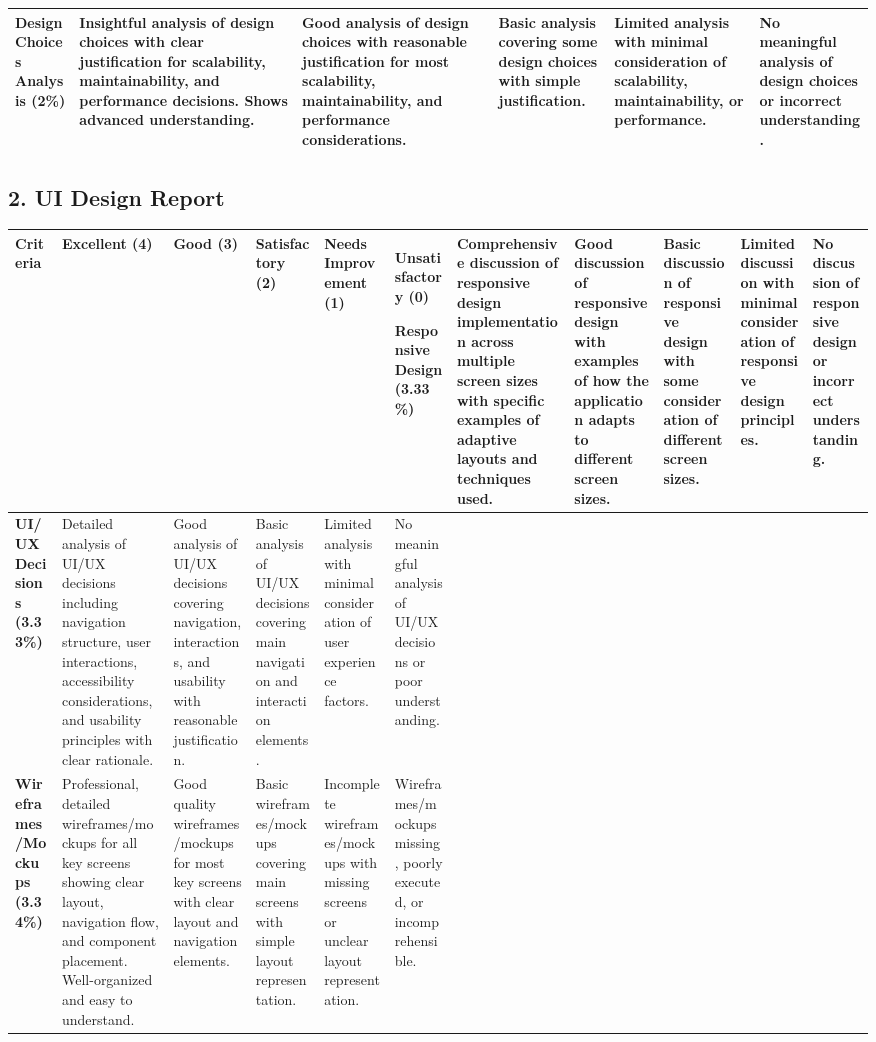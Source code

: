 \documentclass{article}
\begin{document}
\begin{longtable}{|L{3cm}|L{2.2cm}|L{2.2cm}|L{2.2cm}|L{2.2cm}|L{2.2cm}|}
\textbf{Design Choices Analysis (2\%)} & 
Insightful analysis of design choices with clear justification for scalability, maintainability, and performance decisions. Shows advanced understanding. & 
Good analysis of design choices with reasonable justification for most scalability, maintainability, and performance considerations. & 
Basic analysis covering some design choices with simple justification. & 
Limited analysis with minimal consideration of scalability, maintainability, or performance. & 
No meaningful analysis of design choices or incorrect understanding. \\ \hline
\end{longtable}

\subsection*{2. UI Design Report}

\renewcommand{\arraystretch}{1.2}
\begin{longtable}{|L{3cm}|L{2.2cm}|L{2.2cm}|L{2.2cm}|L{2.2cm}|L{2.2cm}|}
\hline
\textbf{Criteria} & \textbf{Excellent (4)} & \textbf{Good (3)} & \textbf{Satisfactory (2)} & \textbf{Needs Improvement (1)} & \textbf{Unsatisfactory (0)} \ \hline
\endhead

\textbf{Responsive Design (3.33\%)} & 
Comprehensive discussion of responsive design implementation across multiple screen sizes with specific examples of adaptive layouts and techniques used. & 
Good discussion of responsive design with examples of how the application adapts to different screen sizes. & 
Basic discussion of responsive design with some consideration of different screen sizes. & 
Limited discussion with minimal consideration of responsive design principles. & 
No discussion of responsive design or incorrect understanding. \\ \hline

\textbf{UI/UX Decisions (3.33\%)} & 
Detailed analysis of UI/UX decisions including navigation structure, user interactions, accessibility considerations, and usability principles with clear rationale. & 
Good analysis of UI/UX decisions covering navigation, interactions, and usability with reasonable justification. & 
Basic analysis of UI/UX decisions covering main navigation and interaction elements. & 
Limited analysis with minimal consideration of user experience factors. & 
No meaningful analysis of UI/UX decisions or poor understanding. \\ \hline

\textbf{Wireframes/Mockups (3.34\%)} & 
Professional, detailed wireframes/mockups for all key screens showing clear layout, navigation flow, and component placement. Well-organized and easy to understand. & 
Good quality wireframes/mockups for most key screens with clear layout and navigation elements. & 
Basic wireframes/mockups covering main screens with simple layout representation. & 
Incomplete wireframes/mockups with missing screens or unclear layout representation. & 
Wireframes/mockups missing, poorly executed, or incomprehensible. \\ \hline
\end{longtable}
\end{document}
